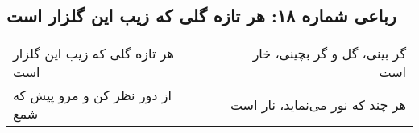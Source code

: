 \begin{center}
\section*{رباعی شماره ۱۸: هر تازه گلی که زیب این گلزار است}
\label{sec:018}
\begin{longtable}{l p{0.5cm} r}
هر تازه گلی که زیب این گلزار است
&&
گر بینی، گل و گر بچینی، خار است
\\
از دور نظر کن و مرو پیش که شمع
&&
هر چند که نور می‌نماید، نار است
\\
\end{longtable}
\end{center}
